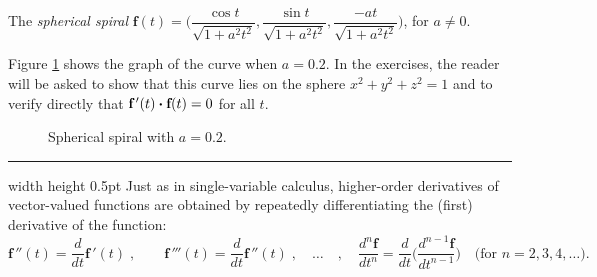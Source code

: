 \begin{exmp}\label{exmp:sphspiral}
 The \emph{spherical spiral}
 $\textbf{f}(t) = \biggl( \dfrac{\cos t}{\sqrt{1 + a^2 t^2}},\dfrac{\sin t}{\sqrt{1 + a^2 t^2}},
  \dfrac{-at}{\sqrt{1 + a^2 t^2}} \biggr)$, for $a \ne 0$.\smallskip
  \par\noindent Figure \ref{fig:sphspiral} shows the graph of the curve when $a = 0.2$. In the exercises, the reader will be asked to
  show that this curve lies on the sphere $x^2 + y^2 + z^2 = 1$ and to verify directly that
  $\textbf{f}\,'(t) \bm{\cdot} \textbf{f}(t) = 0$ for all $t$.
 \begin{figure}[h]
  \begin{center}
   
  \end{center}
 \caption[]{\quad Spherical spiral with $a = 0.2$.}
 \label{fig:sphspiral}
 \end{figure}
\end{exmp}
\hrule width \textwidth height 0.5pt
\vskip3mm
Just as in single-variable calculus, higher-order derivatives of vector-valued functions are obtained by repeatedly
differentiating the (first) derivative of the function:
\begin{displaymath}
 \textbf{f}\,''(t) = \dfrac{d}{dt} \textbf{f}\,'(t) \; , \qquad \textbf{f}\,'''(t) = \dfrac{d}{dt} \textbf{f}\,''(t) \;
 , \quad \ldots \quad , \quad \dfrac{d^{n}\textbf{f}}{dt^{n}} =
 \dfrac{d}{dt} \biggl( \dfrac{d^{n-1}\textbf{f}}{dt^{n-1}} \biggr) \text{~~~(for $n = 2, 3, 4,\ldots$).}
\end{displaymath}

